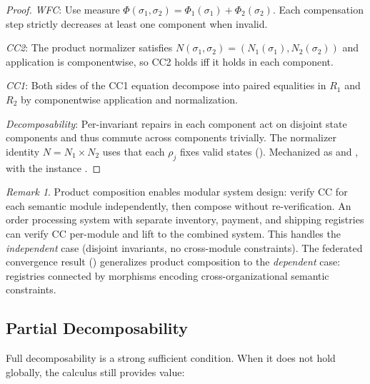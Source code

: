 \documentclass[11pt,a4paper]{article}
\theoremstyle{plain}
\theoremstyle{definition}
\theoremstyle{remark}
\newtheorem{remark}[theorem]{Remark}
\renewcommand{\_}{\textunderscore\allowbreak}
\begin{document}
\begin{proof}
\emph{WFC}: Use measure $\Phi(\sigma_1, \sigma_2) = \Phi_1(\sigma_1) +
\Phi_2(\sigma_2)$.  Each compensation step strictly decreases at least one
component when invalid.

\emph{CC2}: The product normalizer satisfies $N(\sigma_1, \sigma_2) =
(N_1(\sigma_1), N_2(\sigma_2))$ and application is componentwise, so
CC2 holds iff it holds in each component.

\emph{CC1}: Both sides of the CC1 equation decompose into paired equalities
in $R_1$ and $R_2$ by componentwise application and normalization.

\emph{Decomposability}: Per-invariant repairs in each component act on
disjoint state components and thus commute across components trivially.
The normalizer identity $N = N_1 \times N_2$ uses that each $\rho_j$ fixes
valid states ().  Mechanized as 
and , with the instance
.
\end{proof}

\begin{remark}
Product composition enables modular system design: verify CC for each semantic
module independently, then compose without re-verification.  An order
processing system with separate inventory, payment, and shipping registries
can verify CC per-module and lift to the combined system.  This handles the
\emph{independent} case (disjoint invariants, no cross-module constraints).
The federated convergence result () generalizes product
composition to the \emph{dependent} case: registries connected by morphisms
encoding cross-organizational semantic constraints.
\end{remark}

\subsection{Partial Decomposability}

Full decomposability is a strong sufficient condition.  When it does not hold
globally, the calculus still provides value:
\end{document}
